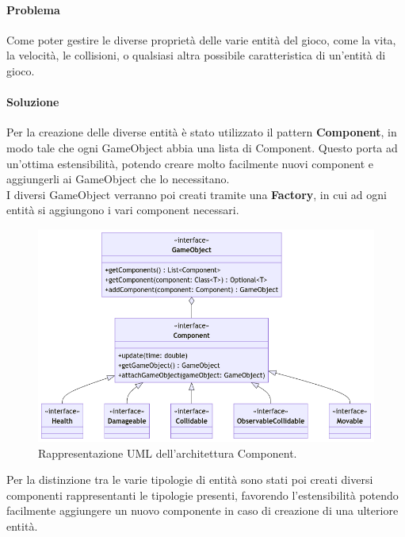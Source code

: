 \documentclass[a4paper,12pt]{report}
\begin{document}
\paragraph*{Problema} Come poter gestire le diverse proprietà delle varie entità del gioco, come la vita, la velocità, le collisioni, o qualsiasi altra possibile caratteristica di un’entità di gioco.
\paragraph*{Soluzione} Per la creazione delle diverse entità è stato utilizzato il pattern \textbf{Component}, in modo tale che ogni GameObject abbia una lista di Component. Questo porta ad un’ottima estensibilità, potendo creare molto facilmente nuovi component e aggiungerli ai GameObject che lo necessitano.\\ 
I diversi GameObject verranno poi creati tramite una \textbf{Factory}, in cui ad ogni entità si aggiungono i vari component necessari.
%
\begin{figure}[H]
	\centering{}
	\includegraphics[scale=0.75]{img/component.png}
	\caption{Rappresentazione UML dell'architettura Component.}
	\label{img:strategy}
	\end{figure}
%
Per la distinzione tra le varie tipologie di entità sono stati poi creati diversi componenti rappresentanti le tipologie presenti, favorendo l’estensibilità potendo facilmente aggiungere un nuovo componente in caso di creazione di una ulteriore entità.
\newpage
\end{document}
